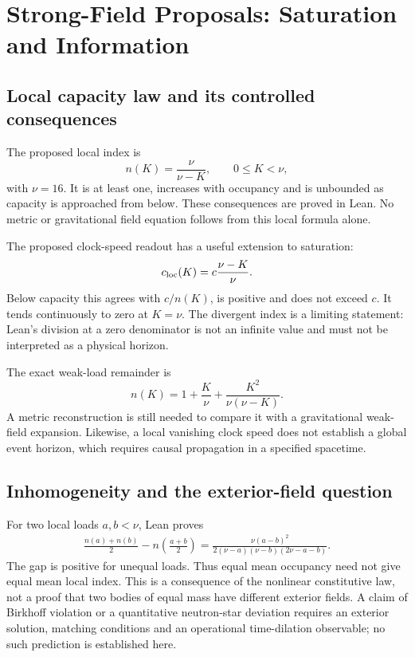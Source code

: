 \section{Strong-Field Proposals: Saturation and Information}
\subsection{Local capacity law and its controlled consequences}
The proposed local index is
\begin{equation}
n(K)=\frac{\nu}{\nu-K},\qquad 0\leq K<\nu,
\end{equation}
with $\nu=16$. It is at least one, increases with occupancy and is unbounded as capacity is approached from below. These consequences are proved in Lean. No metric or gravitational field equation follows from this local formula alone.

The proposed clock-speed readout has a useful extension to saturation:
\begin{equation}
c_{\rm loc}(K)=c\frac{\nu-K}{\nu}.
\end{equation}
Below capacity this agrees with $c/n(K)$, is positive and does not exceed $c$. It tends continuously to zero at $K=\nu$. The divergent index is a limiting statement: Lean's division at a zero denominator is not an infinite value and must not be interpreted as a physical horizon.

The exact weak-load remainder is
\begin{equation}
n(K)=1+\frac K\nu+\frac{K^2}{\nu(\nu-K)}.
\end{equation}
A metric reconstruction is still needed to compare it with a gravitational weak-field expansion. Likewise, a local vanishing clock speed does not establish a global event horizon, which requires causal propagation in a specified spacetime.

\subsection{Inhomogeneity and the exterior-field question}
For two local loads $a,b<\nu$, Lean proves
\begin{equation}
\begin{split}
\frac{n(a)+n(b)}2-n\!\left(\frac{a+b}2\right)
=\frac{\nu(a-b)^2}{2(\nu-a)(\nu-b)(2\nu-a-b)}.
\end{split}
\end{equation}
The gap is positive for unequal loads. Thus equal mean occupancy need not give equal mean local index. This is a consequence of the nonlinear constitutive law, not a proof that two bodies of equal mass have different exterior fields. A claim of Birkhoff violation or a quantitative neutron-star deviation requires an exterior solution, matching conditions and an operational time-dilation observable; no such prediction is established here.

